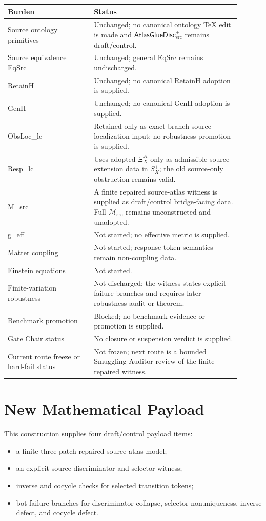 \documentclass[11pt]{article}
\newcommand{\Msrc}{\mathcal{M}_{\mathrm{src}}}
\newcommand{\XiR}{\Xi_X^R}
\newcommand{\Splus}{S_X^+}
\newcommand{\AtlasGlueDisc}{\mathsf{AtlasGlueDisc}_{\mathrm{src}}^{+}}
\begin{document}
\begin{center}
\begin{tabular}{p{0.33\linewidth}p{0.57\linewidth}}
\hline
Burden & Status \\
\hline
Source ontology primitives & Unchanged; no canonical ontology TeX edit is made and \(\AtlasGlueDisc\) remains draft/control. \\
Source equivalence EqSrc & Unchanged; general EqSrc remains undischarged. \\
RetainH & Unchanged; no canonical RetainH adoption is supplied. \\
GenH & Unchanged; no canonical GenH adoption is supplied. \\
ObsLoc\_lc & Retained only as exact-branch source-localization input; no robustness promotion is supplied. \\
Resp\_lc & Uses adopted \(\XiR\) only as admissible source-extension data in \(\Splus\); the old source-only obstruction remains valid. \\
M\_src & A finite repaired source-atlas witness is supplied as draft/control bridge-facing data. Full \(\Msrc\) remains unconstructed and unadopted. \\
g\_eff & Not started; no effective metric is supplied. \\
Matter coupling & Not started; response-token semantics remain non-coupling data. \\
Einstein equations & Not started. \\
Finite-variation robustness & Not discharged; the witness states explicit failure branches and requires later robustness audit or theorem. \\
Benchmark promotion & Blocked; no benchmark evidence or promotion is supplied. \\
Gate Chair status & No closure or suspension verdict is supplied. \\
Current route freeze or hard-fail status & Not frozen; next route is a bounded Smuggling Auditor review of the finite repaired witness. \\
\hline
\end{tabular}
\end{center}

\section{New Mathematical Payload}

This construction supplies four draft/control payload items:
\begin{itemize}
  \item a finite three-patch repaired source-atlas model;
  \item an explicit source discriminator and selector witness;
  \item inverse and cocycle checks for selected transition tokens;
  \item bot failure branches for discriminator collapse, selector
  nonuniqueness, inverse defect, and cocycle defect.
\end{itemize}
\end{document}
